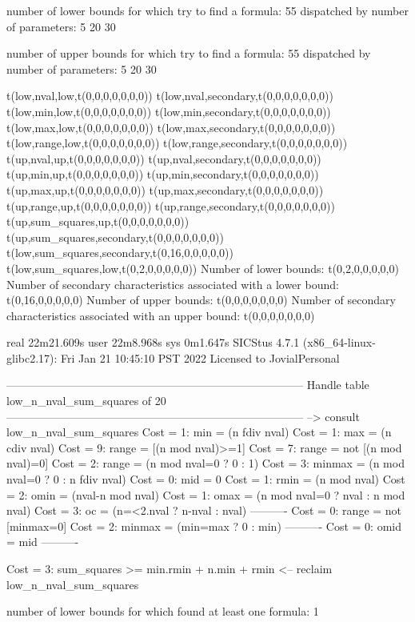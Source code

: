 number of lower bounds for which try to find a formula: 55
dispatched by number of parameters: 5  20  30

number of upper bounds for which try to find a formula: 55
dispatched by number of parameters: 5  20  30

t(low,nval,low,t(0,0,0,0,0,0,0))
t(low,nval,secondary,t(0,0,0,0,0,0,0))
t(low,min,low,t(0,0,0,0,0,0,0))
t(low,min,secondary,t(0,0,0,0,0,0,0))
t(low,max,low,t(0,0,0,0,0,0,0))
t(low,max,secondary,t(0,0,0,0,0,0,0))
t(low,range,low,t(0,0,0,0,0,0,0))
t(low,range,secondary,t(0,0,0,0,0,0,0))
t(up,nval,up,t(0,0,0,0,0,0,0))
t(up,nval,secondary,t(0,0,0,0,0,0,0))
t(up,min,up,t(0,0,0,0,0,0,0))
t(up,min,secondary,t(0,0,0,0,0,0,0))
t(up,max,up,t(0,0,0,0,0,0,0))
t(up,max,secondary,t(0,0,0,0,0,0,0))
t(up,range,up,t(0,0,0,0,0,0,0))
t(up,range,secondary,t(0,0,0,0,0,0,0))
t(up,sum_squares,up,t(0,0,0,0,0,0,0))
t(up,sum_squares,secondary,t(0,0,0,0,0,0,0))
t(low,sum_squares,secondary,t(0,16,0,0,0,0,0))
t(low,sum_squares,low,t(0,2,0,0,0,0,0))
Number of lower bounds:                                             t(0,2,0,0,0,0,0)
Number of secondary characteristics associated with a lower bound:  t(0,16,0,0,0,0,0)
Number of upper bounds:                                             t(0,0,0,0,0,0,0)
Number of secondary characteristics associated with an upper bound: t(0,0,0,0,0,0,0)

real	22m21.609s
user	22m8.968s
sys	0m1.647s
SICStus 4.7.1 (x86_64-linux-glibc2.17): Fri Jan 21 10:45:10 PST 2022
Licensed to JovialPersonal


--------------------------------------------------------------------------------
Handle table low_n_nval_sum_squares of 20
--------------------------------------------------------------------------------
--> consult low_n_nval_sum_squares
Cost =  1:  min    = (n fdiv nval)
Cost =  1:  max    = (n cdiv nval)
Cost =  9:  range  = [(n mod nval)>=1]
Cost =  7:  range  = not [(n mod nval)=0]
Cost =  2:  range  = (n mod nval=0 ? 0 : 1)
Cost =  3:  minmax = (n mod nval=0 ? 0 : n fdiv nval)
Cost =  0:  mid    = 0
Cost =  1:  rmin   = (n mod nval)
Cost =  2:  omin   = (nval-n mod nval)
Cost =  1:  omax   = (n mod nval=0 ? nval : n mod nval)
Cost =  3:  oc     = (n=<2.nval ? n-nval : nval)
----------
Cost =  0:  range  = not [minmax=0]
Cost =  2:  minmax = (min=max ? 0 : min)
----------
Cost =  0:  omid   = mid
----------

Cost =  3:  sum_squares >= min.rmin + n.min + rmin
<-- reclaim low_n_nval_sum_squares

number of lower bounds for which found at least one formula: 1

